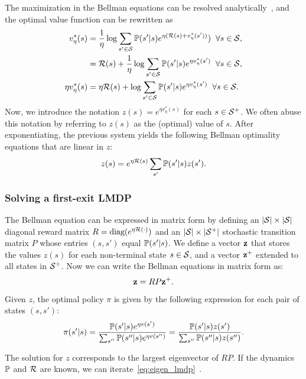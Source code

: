 The maximization in the Bellman equations can be resolved analytically~\citep{Todorov2006}, and the optimal value function can be rewritten as
\begin{align*}
  v^*_\eta(s)      &=  \frac 1 \eta \log{\sum_{s'\in\mathcal{S}}\mathbb{P}(s'\lvert s)e^{\eta(\mathcal{R}(s) + v^*_\eta(s'))})} \;\;\forall s\in\mathcal{S}, \\
                   &=  \mathcal{R}(s) + \frac 1 \eta \log{\sum_{s'\in\mathcal{S}}\mathbb{P}(s'\lvert s)e^{\eta v^*_\eta(s')}} \;\;\forall s\in\mathcal{S}, \\
  \eta v^*_\eta(s) &=  \eta \mathcal{R}(s) + \log{\sum_{s'\in\mathcal{S}}\mathbb{P}(s'\lvert s)e^{\eta v^*_\eta(s')}} \;\;\forall s\in\mathcal{S}.
\end{align*}
Now, we introduce the notation $z(s)=e^{\eta v^*_\eta(s)}$ for each $s\in\mathcal{S}^+$. We often abuse this notation by referring to $z(s)$ as the (optimal) value of $s$. After exponentiating, the previous system yields the following Bellman optimality equations that are linear in $z$:
\begin{equation}\label{eq:boe_z_lmdp}
z(s) = e^{\eta\mathcal{R}(s)} \sum_{s'}\mathbb{P}(s'|s)z(s').
\end{equation}
\subsubsection{Solving a first-exit LMDP}
The Bellman equation can be expressed in matrix form by defining an $\lvert\mathcal{S}\rvert\times\lvert\mathcal{S}\rvert$ diagonal reward matrix $R=\text{diag}(e^{\eta\mathcal{R}(\cdot)})$ and an $\lvert\mathcal{S}\rvert\times \lvert\mathcal{S}^+\rvert$ stochastic transition matrix $P$ whose entries $(s,s')$ equal $\mathbb{P}(s'|s)$. We define a vector $\bf z$ that stores the values $z(s)$ for each non-terminal state $s\in\mathcal{S}$, and a vector $\bf z^+$ extended to all states in $\mathcal{S}^+$. Now we can write the Bellman equations in matrix form as:
\begin{equation}\label{eq:eigen_lmdp}
{\bf z} = R P {\bf z^+}.
\end{equation}
Given $z$, the optimal policy $\pi$ is given by the following expression for each pair of states $(s,s')$:
\begin{equation}
\label{eq:lmdp_optimal_policy}
\pi(s'|s) =  \frac {\mathbb{P}(s'|s) e^{\eta v(s')} } {\sum_{s''} \mathbb{P}(s''|s) e^{\eta v(s'')} } = \frac {\mathbb{P}(s'|s)z(s')} {\sum_{s''} \mathbb{P}(s''|s)z(s'')}.
\end{equation}

The solution for $z$ corresponds to the largest eigenvector of $RP$.
If the dynamics $\mathbb{P}$ and $\mathcal{R}$ are known, we can iterate~\eqref{eq:eigen_lmdp}~\citep{Todorov2006}.

